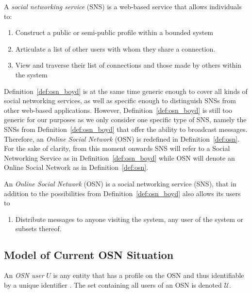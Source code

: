 \begin{defn}
\label{def:osn_boyd}
 A \textit{social networking service} (SNS) is a web-based service that allows individuals to:
 \begin{enumerate}
  \item Construct a public or semi-public profile within a bounded system
  \item Articulate a list of other users with whom they share a connection.
  \item View and traverse their list of connections and those made by others within the system
  \setcounter{enumTemp}{\theenumi}
 \end{enumerate}
\end{defn}

Definition~\ref{def:osn_boyd} is at the same time generic enough to cover all kinds of social networking services, as well as specific enough to distinguish SNSs from other web-based applications. However, Definition~\ref{def:osn_boyd} is still too generic for our purposes as we only consider one specific type of SNS, namely the SNSs from Definition~\ref{def:osn_boyd} that offer the ability to broadcast messages. Therefore, an \textit{Online Social Network} (OSN) is redefined in Definition~\ref{def:osn}. For the sake of clarity, from this moment onwards SNS will refer to a Social Networking Service as in Definition~\ref{def:osn_boyd} while OSN will denote an Online Social Network as in Definition~\ref{def:osn}.

\begin{defn}[OSN]
\label{def:osn}
 An \textit{Online Social Network} (OSN) is a social networking service (SNS), that in addition to the possibilities from Definition~\ref{def:osn_boyd} also allows its users to
 \begin{enumerate}
  \setcounter{enumi}{\theenumTemp}
  \item Distribute messages to anyone visiting the system, any user of the system or subsets thereof.
 \end{enumerate}
\end{defn}


\subsection{Model of Current OSN Situation}
\label{sec:model}
\begin{defn}
\label{def:user}
 An \textit{OSN user} $U$ is any entity that has a profile on the OSN and thus identifiable by a unique identifier . The set containing all users of an OSN is denoted $\mathcal{U}$.
\end{defn}

